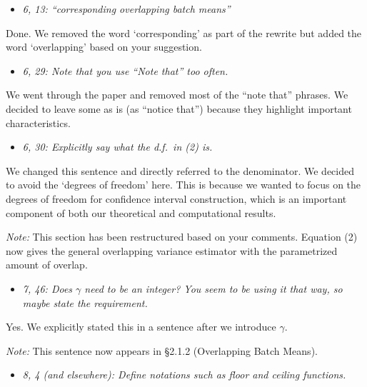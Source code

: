 \documentclass[11pt,notitlepage,onecolumn]{article}
\newcommand{\noi}{\noindent}
\begin{document}
\begin{itemize}
\item[] \textit{6, 13: ``corresponding overlapping batch means''}
\end{itemize}

\noi
Done.  
We removed the word `corresponding' as part of the rewrite but added the word `overlapping' based on your suggestion.
\medskip 

\begin{itemize}
\item[] \textit{6, 29: Note that you use ``Note that'' too often.}
\end{itemize}

\noi
We went through the paper and removed most of the ``note that'' phrases. 
We decided to leave some as is (as ``notice that'') because they highlight important characteristics.  
\medskip 



\begin{itemize}
\item[] \textit{6, 30: Explicitly say what the d.f.\ in (2) is.}
\end{itemize}

\noi
We changed this sentence and directly referred to the denominator.
We decided to avoid the `degrees of freedom' here. 
This is because we wanted to focus on the degrees of freedom for confidence interval construction, which is an important component of both our theoretical and computational results.\medskip  

\noi 
{\it Note:} This section has been restructured based on your comments. 
Equation (2) now gives the general overlapping variance estimator with the parametrized amount of overlap. 
\medskip 



\begin{itemize}
\item[] \textit{7, 46: Does $\gamma$ need to be an integer? 
You seem to be using it that way, so maybe state the requirement.}
\end{itemize}

\noi
Yes. We explicitly stated this in a sentence after we introduce $\gamma$.
\medskip 

\noi 
{\it Note:} This sentence now appears in \S 2.1.2 (Overlapping Batch Means). 
\medskip 



\begin{itemize}
\item[] \textit{8, 4 (and elsewhere): Define notations such as floor and ceiling functions.}
\end{itemize}
\end{document}
